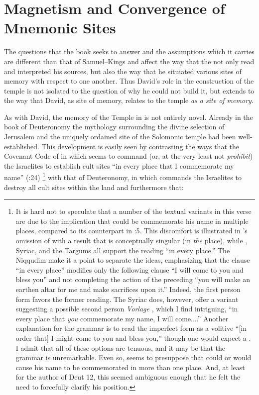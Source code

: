 
\section{Magnetism and Convergence of Mnemonic Sites}

The questions that the book \chroncicles seeks to answer and the assumptions which it carries are different than that of Samuel--Kings and affect the way that the \chronciler not only read and interpreted his sources, but also the way that he situiated various sites of memory with respect to one another. Thus David's role in the construction of the temple is not isolated to the question of why he could not build it, but extends to the way that David, as site of memory, relates to the temple \emph{as a site of memory}.

As with David, the memory of the Temple in \chronicles is not entirely novel. Already in the book of Deuteronomy the mythology surrounding the divine selection of Jerusalem and the uniquely ordained site of the Solomonic temple had been well-established. This development is easily seen by contrasting the ways that the Covenant Code of  in which \yahweh seems to command (or, at the very least not \emph{prohibit}) the Israelites to establish cult sites  ``in every place that I commemorate my name'' (:24)%
    \footnote{It is hard not to speculate that a number of the textual variants in this verse are due to the implication that \yahweh could be commemorate his name in multiple places, compared to its counterpart in :5. This discomfort is illustrated in  \sampent's omission of  with a result that  is conceptually singular (in \emph{the} place), while \lxx, Syriac, and the Targums all support the reading ``in every place.'' The Niqqudim make it a point to separate the ideas, emphasizing that the clause  ``in every place'' modifies only the following clause  ``I will come to you and bless you'' and not completing the action of the preceding  ``you will make an earthen altar for me and make sacrifices upon it.'' Indeed, the first person form  favors the former reading. The Syriac does, however, offer a variant suggesting a possible second person \emph{Vorlage} , which I find intriguing, ``in every place that \emph{you} commemorate my name, I will come....'' Another explanation for the grammar is to read the imperfect form  as a volitive ``[in order that] I might come to you and bless you,'' though one would expect a . I admit that all of these options are tenuous, and it may be that the grammar is unremarkable. Even so,  seems to presuppose that \yahweh could or would cause his name to be commemorated in more than one place. And, at least for the author of Deut 12, this seemed ambiguous enough that he felt the need to forcefully clarify his position.}
with that of Deuteronomy, in which \yahweh commands the Israelites to destroy all cult sites within the land and furthermore that: 

